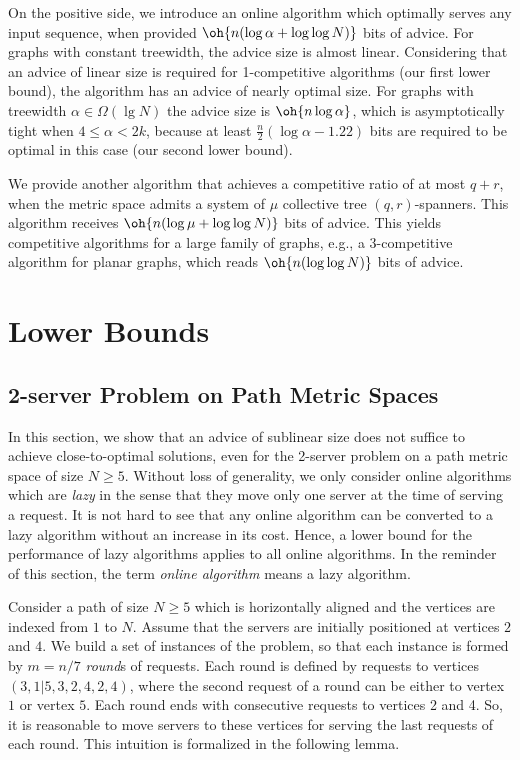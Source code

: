 On the positive side, we introduce an online algorithm which optimally serves any input sequence, when provided $\oh{n (\log \alpha + \log \log N)}$ bits of advice. For graphs with constant treewidth, the advice size is almost linear. Considering that an advice of linear size is required for 1-competitive algorithms (our first lower bound), the algorithm has an advice of nearly optimal size.
For graphs with treewidth $\alpha \in \Omega(\lg N)$
the advice size is $\oh{n \log \alpha}$, which is asymptotically tight when $4 \leq \alpha < 2k$, because at least $\frac{n}{2}(\log \alpha- 1.22)$ bits are required to be optimal in this case (our second lower bound). 

We provide another algorithm that achieves a competitive ratio of at most $q+r$, when the metric space admits a system of $\mu$ collective tree $(q,r)$-spanners. This 
algorithm receives $\oh{n (\log \mu + \log \log N)}$ bits of advice. This yields competitive algorithms for a large family of graphs, e.g., a 3-competitive algorithm for planar graphs, which reads $\oh{n (\log \log N)}$ bits of advice.



\section{Lower Bounds}

\subsection{2-server Problem on Path Metric Spaces}
In this section, we show that an advice of sublinear size does not suffice to achieve close-to-optimal solutions, even for the 2-server problem on a path metric space of size $N \geq 5$. 
Without loss of generality, we only consider online algorithms which are \textit{lazy} in the sense that they move only one server at the time of serving a request. 
It is not hard to see that any online algorithm can be converted to a lazy algorithm without an increase in its cost. Hence, a lower bound for the performance of lazy algorithms applies to all online algorithms. In the reminder of this section, the term {\it online algorithm} means a lazy algorithm.

Consider a path of size $N \geq 5$ which is horizontally aligned and the vertices are indexed from $1$ to $N$. Assume that the servers are initially positioned at vertices $2$ and $4$. We build a set of instances of the problem, so that each instance is formed by $m = n/7$ \textit{round}s of requests. Each round is defined by requests to vertices $(3, 1|5, 3, 2, 4, 2, 4)$, where the second request of a round can be either to vertex $1$ or vertex $5$. Each round ends with consecutive requests to vertices 2 and 4. So, it is reasonable to move servers to these vertices for serving the last requests of each round. This intuition is formalized in the following lemma.

